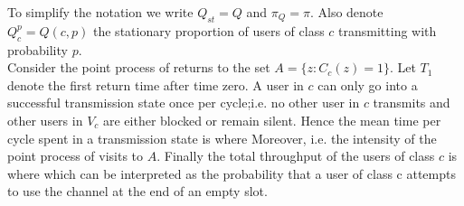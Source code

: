 \documentclass[letterpaper,english,10pt]{article}
\begin{document}
To simplify the notation we write $Q_{st} = Q$ and $\pi_Q = \pi$. Also denote $Q^p_c = Q({c, p})$ the stationary proportion of users of class $c$ transmitting with probability $p$.\\

Consider the point process of returns to the set $A = \{z : C_c(z) = 1\}$. Let $T_1$ denote the first return time after time zero. 
A user in $c$ can only go into a successful transmission state once per cycle;i.e. no other user in $c$ transmits and other users in $V_c$ are either blocked or remain silent. Hence the mean time per cycle spent in a transmission state is  where 
Moreover, i.e. the intensity of the point process of visits to $A$. Finally the total throughput of the users of class $c$ is  where
which can be interpreted as the probability that a user of class c attempts
to use the channel at the end of an empty slot.
%
\end{document}
